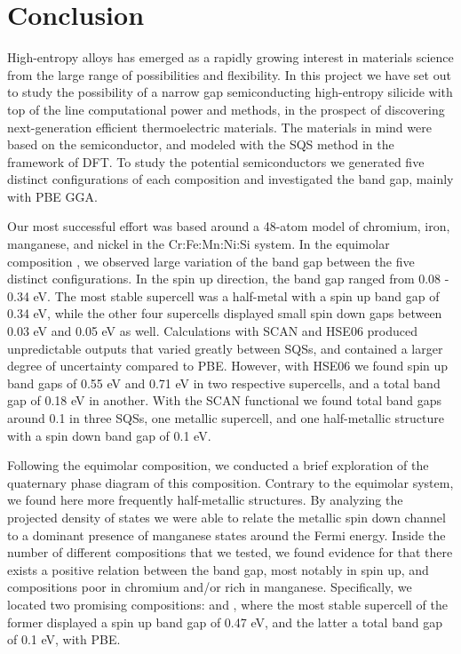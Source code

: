 \documentclass[UKenglish]{ifimaster}  %
\begin{document}
\chapter{Conclusion}

High-entropy alloys has emerged as a rapidly growing interest in materials science from the large range of possibilities and flexibility. In this project we have set out to study the possibility of a narrow gap semiconducting high-entropy silicide with top of the line computational power and methods, in the prospect of discovering next-generation efficient thermoelectric materials. The materials in mind were based on the  semiconductor, and modeled with the SQS method in the framework of DFT. To study the potential semiconductors we generated five distinct configurations of each composition and investigated the band gap, mainly with PBE GGA.  

Our most successful effort was based around a 48-atom model of chromium, iron, manganese, and nickel in the Cr:Fe:Mn:Ni:Si system. In the equimolar composition , we observed large variation of the band gap between the five distinct configurations. In the spin up direction, the band gap ranged from 0.08 - 0.34 eV. The most stable supercell was a half-metal with a spin up band gap of 0.34 eV, while the other four supercells displayed small spin down gaps between 0.03 eV and 0.05 eV as well. Calculations with SCAN and HSE06 produced unpredictable outputs that varied greatly between SQSs, and contained a larger degree of uncertainty compared to PBE. However, with HSE06 we found spin up band gaps of 0.55 eV and 0.71 eV in two respective supercells, and a total band gap of 0.18 eV in another. With the SCAN functional we found total band gaps around 0.1 in three SQSs, one metallic supercell, and one half-metallic structure with a spin down band gap of 0.1 eV.   

Following the equimolar composition, we conducted a brief exploration of the quaternary phase diagram of this composition. Contrary to the equimolar system, we found here more frequently half-metallic structures. By analyzing the projected density of states we were able to relate the metallic spin down channel to a dominant presence of manganese states around the Fermi energy.  Inside the number of different compositions that we tested, we found evidence for that there exists a positive relation between the band gap, most notably in spin up, and compositions poor in chromium and/or rich in manganese. Specifically, we located two promising compositions:  and , where the most stable supercell of the former displayed a spin up band gap of 0.47 eV, and the latter a total band gap of 0.1 eV, with PBE.
\end{document}
